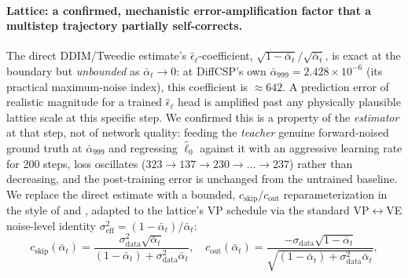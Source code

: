 \documentclass{article}
\begin{document}
\paragraph{Lattice: a confirmed, mechanistic error-amplification factor that a multistep trajectory partially self-corrects.} The direct DDIM/Tweedie estimate's $\hat\epsilon_\ell$-coefficient, $\sqrt{1-\bar\alpha_t}/\sqrt{\bar\alpha_t}$, is exact at the boundary but \emph{unbounded} as $\bar\alpha_t \to 0$: at DiffCSP's own $\bar\alpha_{999} = 2.428\times10^{-6}$ (its practical maximum-noise index), this coefficient is $\approx 642$. A prediction error of realistic magnitude for a trained $\hat\epsilon_\ell$ head is amplified past any physically plausible lattice scale at this specific step. We confirmed this is a property of the \emph{estimator} at that step, not of network quality: feeding the \emph{teacher} genuine forward-noised ground truth at $\bar\alpha_{999}$ and regressing $\hat\ell_0$ against it with an aggressive learning rate for 200 steps, loss oscillates ($323 \to 137 \to 230 \to \dots \to 237$) rather than decreasing, and the post-training error is unchanged from the untrained baseline. We replace the direct estimate with a bounded, $c_{\text{skip}}/c_{\text{out}}$ reparameterization in the style of \citet{Karras:2022edm} and \citet{Song:2023cm}, adapted to the lattice's VP schedule via the standard VP$\leftrightarrow$VE noise-level identity $\sigma_{\text{eff}}^2 = (1-\bar\alpha_t)/\bar\alpha_t$:
\[
  c_{\text{skip}}(\bar\alpha_t) = \frac{\sigma_{\text{data}}^2\sqrt{\bar\alpha_t}}{(1-\bar\alpha_t) + \sigma_{\text{data}}^2\bar\alpha_t}, \quad
  c_{\text{out}}(\bar\alpha_t) = \frac{-\sigma_{\text{data}}\sqrt{1-\bar\alpha_t}}{\sqrt{(1-\bar\alpha_t) + \sigma_{\text{data}}^2\bar\alpha_t}},
\]
\end{document}
